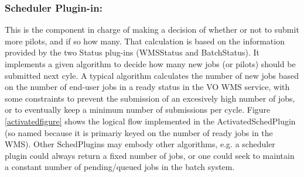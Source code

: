 \documentclass[a4paper]{jpconf}
\begin{document}
\subsubsection{Scheduler Plugin-in:}
This is the component in charge of making a decision of whether or not to submit
more pilots, and if so how many. That calculation is based on the information
provided by the two Status plug-ins (WMSStatus and BatchStatus).
It implements a given algorithm to decide how many new jobs (or pilots) should be submitted next cyle. 
A typical algorithm calculates the number of new jobs based on the number of end-user jobs in a ready status in the VO WMS service, 
with some constraints to prevent the submission of an excesively high number of
jobs, or to eventually keep a minimum number of submissions per cycle. 
Figure \ref{activatedfigure} shows the logical flow implemented in the
ActivatedSchedPlugin (so named because it is primariy keyed on the number of
ready jobs in the WMS). Other SchedPlugins may embody other algorithms, e.g. a
scheduler plugin could always return a fixed number of jobs, or one could seek
to maintain a constant number of pending/queued jobs in the batch system. 
\end{document}
